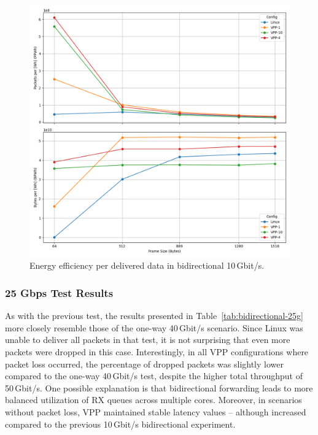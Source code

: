 \begin{figure}[!htbp]
    \centering
    \includegraphics[width=\linewidth]{images/consumption-bi-10g.png}
    \caption{Energy efficiency per delivered data in bidirectional 10\,Gbit/s.}
    \label{fig:bi-10g}
\end{figure}

\subsubsection{25 Gbps Test Results}

As with the previous test, the results presented in Table~\ref{tab:bidirectional-25g} more closely resemble those of the one-way 40\,Gbit/s scenario.  
Since Linux was unable to deliver all packets in that test, it is not surprising that even more packets were dropped in this case.  
Interestingly, in all VPP configurations where packet loss occurred, the percentage of dropped packets was slightly lower compared to the one-way 40\,Gbit/s test, 
despite the higher total throughput of 50\,Gbit/s.  
One possible explanation is that bidirectional forwarding leads to more balanced utilization of RX queues across multiple cores.  
Moreover, in scenarios without packet loss, VPP maintained stable latency values -- although increased compared to the previous 10\,Gbit/s bidirectional experiment.

